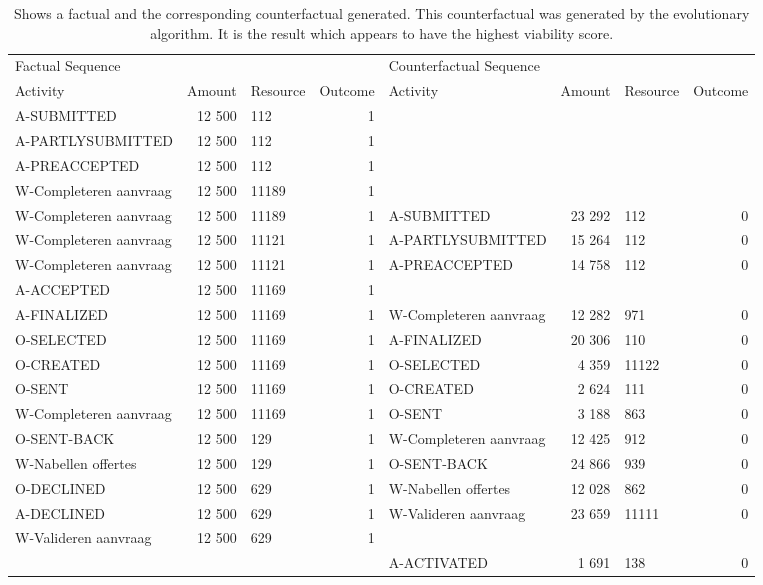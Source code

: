 \begin{table}
\caption{Shows a factual and the corresponding counterfactual generated. This counterfactual was generated by the evolutionary algorithm. It is the result which appears to have the highest viability score.}
\label{tbl:example-cf-evo}
\begin{tabular}{lrlrlrlr}
\toprule
\multicolumn{4}{l}{Factual Sequence} & \multicolumn{4}{l}{Counterfactual Sequence} \\
Activity & Amount & Resource & Outcome & Activity & Amount & Resource & Outcome \\
\midrule
A-SUBMITTED & 12 500 & 112 & 1 &  &  &  &  \\
A-PARTLYSUBMITTED & 12 500 & 112 & 1 &  &  &  &  \\
A-PREACCEPTED & 12 500 & 112 & 1 &  &  &  &  \\
W-Completeren aanvraag & 12 500 & 11189 & 1 &  &  &  &  \\
W-Completeren aanvraag & 12 500 & 11189 & 1 & A-SUBMITTED & 23 292 & 112 & 0 \\
W-Completeren aanvraag & 12 500 & 11121 & 1 & A-PARTLYSUBMITTED & 15 264 & 112 & 0 \\
W-Completeren aanvraag & 12 500 & 11121 & 1 & A-PREACCEPTED & 14 758 & 112 & 0 \\
A-ACCEPTED & 12 500 & 11169 & 1 &  &  &  &  \\
A-FINALIZED & 12 500 & 11169 & 1 & W-Completeren aanvraag & 12 282 & 971 & 0 \\
O-SELECTED & 12 500 & 11169 & 1 & A-FINALIZED & 20 306 & 110 & 0 \\
O-CREATED & 12 500 & 11169 & 1 & O-SELECTED & 4 359 & 11122 & 0 \\
O-SENT & 12 500 & 11169 & 1 & O-CREATED & 2 624 & 111 & 0 \\
W-Completeren aanvraag & 12 500 & 11169 & 1 & O-SENT & 3 188 & 863 & 0 \\
O-SENT-BACK & 12 500 & 129 & 1 & W-Completeren aanvraag & 12 425 & 912 & 0 \\
W-Nabellen offertes & 12 500 & 129 & 1 & O-SENT-BACK & 24 866 & 939 & 0 \\
O-DECLINED & 12 500 & 629 & 1 & W-Nabellen offertes & 12 028 & 862 & 0 \\
A-DECLINED & 12 500 & 629 & 1 & W-Valideren aanvraag & 23 659 & 11111 & 0 \\
W-Valideren aanvraag & 12 500 & 629 & 1 &  &  &  &  \\
 &  &  &  & A-ACTIVATED & 1 691 & 138 & 0 \\
\bottomrule
\end{tabular}
\end{table}
